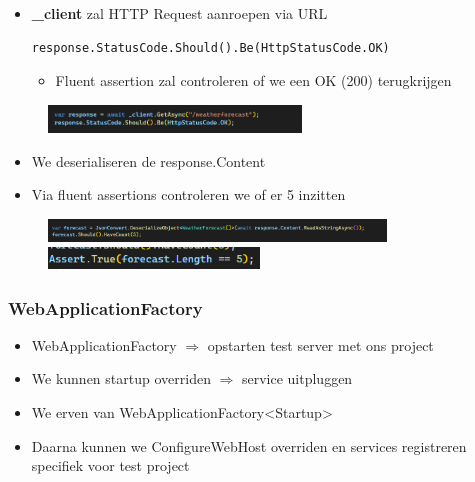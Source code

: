 \documentclass{article}
\begin{document}
\begin{itemize}
    \item \textbf{\_client} zal HTTP Request aanroepen via URL
\begin{verbatim}
response.StatusCode.Should().Be(HttpStatusCode.OK)
\end{verbatim}
    \begin{itemize}
        \item Fluent assertion zal controleren of we een OK (200) terugkrijgen
    \end{itemize}
\end{itemize}

\begin{figure}[H]
    \centering
    \includegraphics[width=0.6\textwidth]{integration-test2.png}
\end{figure}


\begin{itemize}
    \item We deserialiseren de response.Content
    \item Via fluent assertions controleren we of er 5 inzitten
\end{itemize}

\begin{figure}[H]
    \centering
    \includegraphics[width=0.8\textwidth]{integration-test3.png}
    \includegraphics[width=0.5\textwidth]{integration-test4.png}
    \caption{}
\end{figure}

\subsubsection{WebApplicationFactory}

\begin{itemize}
    \item WebApplicationFactory $\Rightarrow$ opstarten test server met ons project
    \item We kunnen startup overriden $\Rightarrow$ service uitpluggen
    \item We erven van WebApplicationFactory<Startup>
    \item Daarna kunnen we ConfigureWebHost overriden en services registreren specifiek voor test project
\end{itemize}
\end{document}
